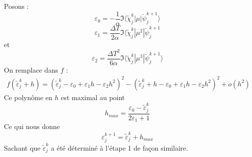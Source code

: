 Posons :
\begin{equation}
\varepsilon_0=-\frac{1}{\alpha} \Im \langle \tilde{\chi}_j^k |\mu| \breve{\psi}_j^{k+1} \rangle
\end{equation}
\begin{equation}
\varepsilon_1=\frac{\Delta T}{2\alpha} \Im \langle \tilde{\chi}_j^k |\mu^2| \breve{\psi}_j^{k+1}
\end{equation}
et
\begin{equation}
\varepsilon_2=\frac{\Delta T^2}{6\alpha} \Im \langle \tilde{\chi}_j^k |\mu^3| \breve{\psi}_j^{k+1} \rangle
\end{equation}
On remplace dans $f$ :
\begin{align*}
f(\tilde{\varepsilon}_j^k+h)= (\tilde{\varepsilon}_j^k-\varepsilon_0+\varepsilon_1 h-\varepsilon_2 h^2)^2 - (\tilde{\varepsilon}_j^k+h-\varepsilon_0+\varepsilon_1 h-\varepsilon_2 h^2)^2 + o(h^2)
\end{align*}
Ce polynôme en $h$ est maximal au point
\begin{equation}
h_{max}=\dfrac{\varepsilon_0-\tilde{\varepsilon}_j^k}{2\varepsilon_1+1}
\end{equation}
Ce qui nous donne 
\begin{equation}
\varepsilon_j^{k+1}= \tilde{\varepsilon}_j^k+h_{max}
\end{equation}
Sachant que $\tilde{\varepsilon}_j^k$ a été déterminé à l'étape 1 de façon similaire.
